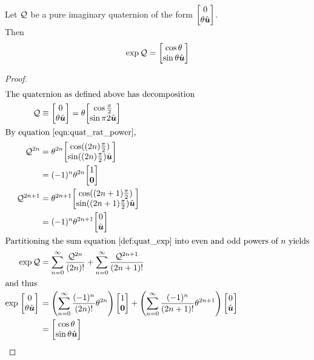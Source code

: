 \begin{theorem}\label{thm:quat_exp_imQ}
Let $\mathcal{Q}$ be a pure imaginary quaternion of the form
$\quatsv 0 {\theta \vhat u}$. \\
Then
\begin{equation}
  \exp \quat Q = \quatsv {\cos \theta} {\sin \theta \vhat u}\label{eqn:quat_exp_imQ_Euler}
\end{equation}
\end{theorem}
\begin{proof}
\begin{align*}
\intertext{The quaternion as defined above has decomposition}
  \quat Q &\equiv \quatsv 0 {\theta \vhat u}
          = \theta \quatsv {\cos \frac \pi 2} {\sin \pi 2 \vhat u} \\
\intertext{By equation~\eqref{eqn:quat_rat_power},}
  \quat Q ^{2n} &= \theta^{2n}
                   \quatsv {\cos ((2n) \frac \pi 2)}
                           {\sin ((2n) \frac\pi 2) \vhat u} \\
                &= (-1)^n \theta^{2n} \quatsv 1 {\vect 0} \\
  \quat Q ^{2n+1} &= \theta^{2n+1}
                     \quatsv {\cos ((2n+1) \frac \pi 2)}
                             {\sin ((2n+1) \frac\pi 2) \vhat u} \\
                &= (-1)^n \theta^{2n+1}  \quatsv 0 {\vhat u} \\
\intertext{Partitioning the sum equation~\eqref{def:quat_exp}
           into even and odd powers of $n$ yields}
\exp \quat Q &= \sum_{n=0}^\infty \frac{\quat Q^{2n}}{(2n)!} +
                \sum_{n=0}^\infty \frac{\quat Q^{2n+1}}{(2n+1)!} \\
\intertext{and thus}
  \exp\left.\quatsv 0 {\theta \vhat u} \right. &=
    \left(\sum_{n=0}^\infty \frac {(-1)^n} {(2n)!} \theta^{2n} \right)
      \quatsv 1 {\vect 0} +
    \left(\sum_{n=0}^\infty \frac {(-1)^n} {(2n+1)!} \theta^{2n+1} \right)
      \quatsv 0 {\vhat u} \\
  &= \quatsv {\cos \theta} {\sin \theta \vhat u}
\end{align*}
\end{proof}

